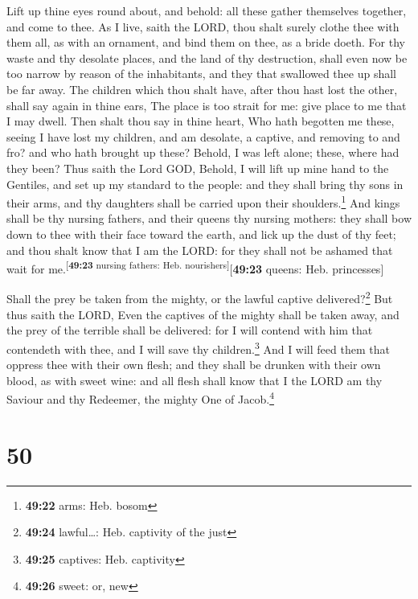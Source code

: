 Lift up thine eyes round about, and behold: all these
gather themselves together, and come to thee. As I live, saith the LORD,
thou shalt surely clothe thee with them all, as with an ornament, and
bind them on thee, as a bride doeth.  For thy waste and
thy desolate places, and the land of thy destruction, shall even now be
too narrow by reason of the inhabitants, and they that swallowed thee up
shall be far away.  The children which thou shalt have,
after thou hast lost the other, shall say again in thine ears, The place
is too strait for me: give place to me that I may dwell. 
Then shalt thou say in thine heart, Who hath begotten me these, seeing I
have lost my children, and am desolate, a captive, and removing to and
fro? and who hath brought up these? Behold, I was left alone; these,
where had they been?  Thus saith the Lord GOD, Behold, I
will lift up mine hand to the Gentiles, and set up my standard to the
people: and they shall bring thy sons in their arms, and thy daughters
shall be carried upon their shoulders.\footnote{\textbf{49:22} arms:
  Heb. bosom}  And kings shall be thy nursing fathers,
and their queens thy nursing mothers: they shall bow down to thee with
their face toward the earth, and lick up the dust of thy feet; and thou
shalt know that I am the LORD: for they shall not be ashamed that wait
for me.\textsuperscript{{[}\textbf{49:23} nursing fathers: Heb.
nourishers{]}}{[}\textbf{49:23} queens: Heb. princesses{]}

 Shall the prey be taken from the mighty, or the lawful
captive delivered?\footnote{\textbf{49:24} lawful\ldots: Heb. captivity
  of the just}  But thus saith the LORD, Even the
captives of the mighty shall be taken away, and the prey of the terrible
shall be delivered: for I will contend with him that contendeth with
thee, and I will save thy children.\footnote{\textbf{49:25} captives:
  Heb. captivity}  And I will feed them that oppress thee
with their own flesh; and they shall be drunken with their own blood, as
with sweet wine: and all flesh shall know that I the LORD am thy Saviour
and thy Redeemer, the mighty One of Jacob.\footnote{\textbf{49:26}
  sweet: or, new}

\hypertarget{section-49}{%
\section{50}\label{section-49}}

